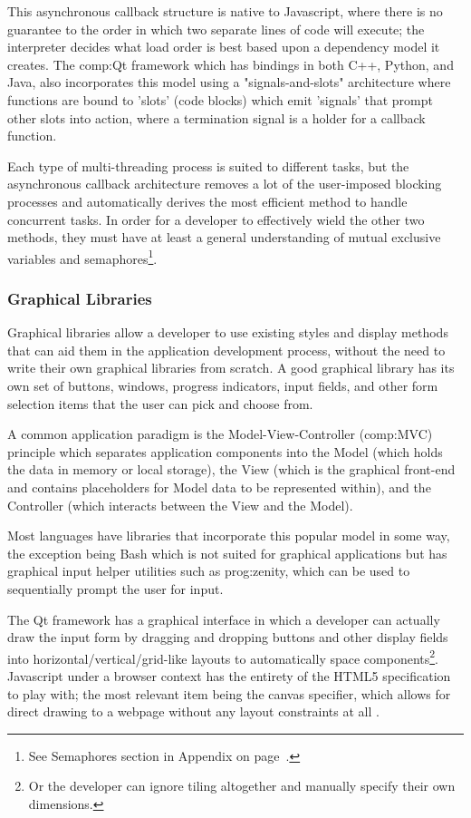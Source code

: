 This asynchronous callback structure is native to Javascript, where there is no guarantee to the order in which two separate lines of code will execute; the interpreter decides what load order is best based upon a dependency model it creates. The \gls{comp:Qt} framework which has bindings in both C++, Python, and Java, also incorporates this model using a "signals-and-slots" architecture where functions are bound to 'slots' (code blocks) which emit 'signals' that prompt other slots into action, where a termination signal is a holder for a callback function.

Each type of multi-threading process is suited to different tasks, but the asynchronous callback architecture removes a lot of the user-imposed blocking processes and automatically derives the most efficient method to handle concurrent tasks. In order for a developer to effectively wield the other two methods, they must have at least a general understanding of mutual exclusive variables and semaphores\footnote{See Semaphores section in Appendix on page~\pageref{ref:app:semaphores}.}. 


\subsubsection{Graphical Libraries}

Graphical libraries allow a developer to use existing styles and display methods that can aid them in the application development process, without the need to write their own graphical libraries from scratch. A good graphical library has its own set of buttons, windows, progress indicators, input fields, and other form selection items that the user can pick and choose from.

A common application paradigm is the Model-View-Controller (\gls{comp:MVC}) principle which separates application components into the Model (which holds the data in memory or local storage), the View (which is the graphical front-end and contains placeholders for Model data to be represented within), and the Controller (which interacts between the View and the Model). 

Most languages have libraries that incorporate this popular model in some way, the exception being Bash which is not suited for graphical applications but has graphical input helper utilities such as \gls{prog:zenity}, which can be used to sequentially prompt the user for input.

The Qt framework has a graphical interface in which a developer can actually draw the input form by dragging and dropping buttons and other display fields into horizontal/vertical/grid-like layouts to automatically space components\footnote{Or the developer can ignore tiling altogether and manually specify their own dimensions.}. Javascript under a browser context has the entirety of the HTML5 specification to play with; the most relevant item being the canvas specifier, which allows for direct drawing to a webpage without any layout constraints at all \cite{html5}.

